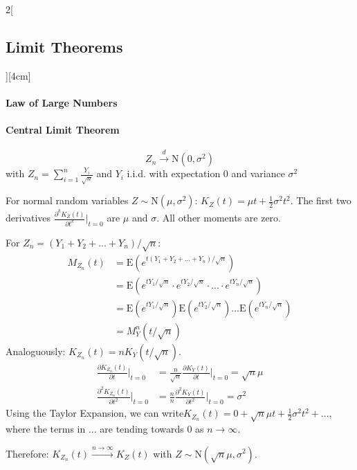 \documentclass[8pt]{extarticle}
\begin{document}
\begin{multicols}{2}[\subsection{Limit Theorems}][4cm]

  \paragraph{Law of Large Numbers} \newpage
  
  \paragraph{Central Limit Theorem}
  
  $$Z_n \overset{d}{\longrightarrow} \mathrm{N}(0, \sigma^2)$$
  with  $Z_n = \sum_{i=1}^{n} \frac{Y_i}{\sqrt{n}}$ and $Y_i$ i.i.d. with expectation $0$ and variance $\sigma^2$
  
\begin{Proof}
For normal random variables $Z \sim \mathrm{N}(\mu, \sigma^2)$: $K_Z(t)=\mu t + \frac{1}{2}\sigma^2t^2$. The first two derivatives $\frac{\partial^kK_Z(t)}{\partial t^k} \bigg|_{t = 0}$ are $\mu$ and $\sigma$. All other moments are zero. 

\noindent For $Z_n = (Y_1 + Y_2 + ... +Y_n)/\sqrt{n}$:
\begin{align*}
M_{Z_n}(t) &= \mathrm{E}\left(e^{t(Y_1 + Y_2 + ... +Y_n)/\sqrt{n}}\right)\\
&= \mathrm{E}\left(e^{tY_1/\sqrt{n}} \cdot e^{tY_2/\sqrt{n}}\cdot ... \cdot e^{tY_n/\sqrt{n}}\right) \\
&= \mathrm{E}\left(e^{tY_1/\sqrt{n}}\right) \mathrm{E}\left(e^{tY_2/\sqrt{n}}\right) ... \mathrm{E}\left(e^{tY_n/\sqrt{n}}\right) \\
&= M_Y^n(t/\sqrt{n})
\end{align*}
Analoguously: $K_{Z_n}(t) = nK_Y(t/\sqrt{n})$.
\begin{align*}
 \frac{\partial K_{Z_n}(t)}{\partial t} \bigg|_{t = 0} &= \frac{n}{\sqrt{n}} \frac{\partial K_Y(t)}{\partial t} \bigg|_{t = 0} = \sqrt{n}\mu \\
 \frac{\partial^2K_{Z_n}(t)}{\partial t^2} \bigg|_{t = 0} &= \frac{n}{n} \frac{\partial^2 K_Y(t)}{\partial t^2} \bigg|_{t = 0} = \sigma^2
\end{align*}
Using the Taylor Expansion, we can write$K_{Z_n}(t) = 0 + \sqrt{n}\mu t + \frac{1}{2}\sigma^2t^2 + ...$, where the terms in $...$ are tending towards 0 as $n \rightarrow \infty$.

\noindent Therefore: $K_{Z_n}(t) \overset{n\rightarrow\infty}{\longrightarrow} K_{Z}(t)$ with $Z \sim \mathrm{N}(\sqrt{n}\mu,\sigma^2)$.
\end{Proof}

\end{multicols}
\end{document}
